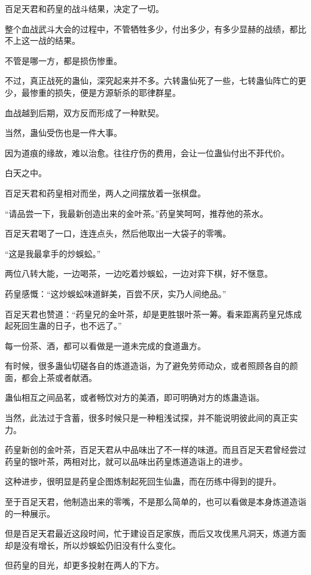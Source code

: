 \begin{this_body}
百足天君和药皇的战斗结果，决定了一切。

整个血战武斗大会的过程中，不管牺牲多少，付出多少，有多少显赫的战绩，都比不上这一战的结果。

不管是哪一方，都是损伤惨重。

不过，真正战死的蛊仙，深究起来并不多。六转蛊仙死了一些，七转蛊仙阵亡的更少，最惨重的损失，便是方源斩杀的耶律群星。

血战越到后期，双方反而形成了一种默契。

当然，蛊仙受伤也是一件大事。

因为道痕的缘故，难以治愈。往往疗伤的费用，会让一位蛊仙付出不菲代价。

白天之中。

百足天君和药皇相对而坐，两人之间摆放着一张棋盘。

“请品尝一下，我最新创造出来的金叶茶。”药皇笑呵呵，推荐他的茶水。

百足天君喝了一口，连连点头，然后他取出一大袋子的零嘴。

“这是我最拿手的炒蜈蚣。”

两位八转大能，一边喝茶，一边吃着炒蜈蚣，一边对弈下棋，好不惬意。

药皇感慨：“这炒蜈蚣味道鲜美，百尝不厌，实乃人间绝品。”

百足天君也赞道：“药皇兄的金叶茶，却是更胜银叶茶一筹。看来距离药皇兄炼成起死回生蛊的日子，也不远了。”

每一份茶、酒，都可以看做是一道未完成的食道蛊方。

有时候，很多蛊仙切磋各自的炼道造诣，为了避免劳师动众，或者照顾各自的颜面，都会上茶或者献酒。

蛊仙相互之间品茗，或者畅饮对方的美酒，即可明确对方的炼蛊造诣。

当然，此法过于含蓄，很多时候只是一种粗浅试探，并不能说明彼此间的真正实力。

药皇新创的金叶茶，百足天君从中品味出了不一样的味道。而且百足天君曾经尝过药皇的银叶茶，两相对比，就可以品味出药皇炼道造诣上的进步。

这种进步，很明显是药皇企图炼制起死回生仙蛊，而在历练中得到的提升。

至于百足天君，他制造出来的零嘴，不是那么简单的，也可以看做是本身炼道造诣的一种展示。

但是百足天君最近这段时间，忙于建设百足家族，而后又攻伐黑凡洞天，炼道方面却是没有增长，所以炒蜈蚣仍旧没有什么变化。

但药皇的目光，却更多投射在两人的下方。


\end{this_body}
